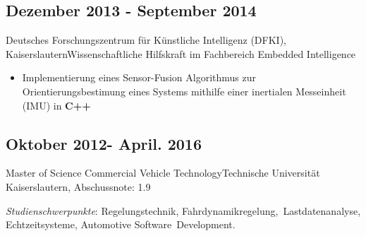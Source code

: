 \documentclass{mycv}
\begin{document}
{\rlap{\color{templateColor1}\rule[0mm]{\textwidth}{\ulinewidth}}}
\begin{paracol}{2}

\switchcolumn
{}

		\subsection{Dezember 2013 - September 2014}{Deutsches Forschungszentrum
			f{\"u}r K{\"u}nstliche Intelligenz (DFKI),
		Kaiserslautern}{Wissenschaftliche Hilfskraft im Fachbereich Embedded
		Intelligence} 
	  \begin{itemize}
			\item Implementierung eines Sensor-Fusion Algorithmus zur
				\,Orientierungsbestimung eines Systems mithilfe einer inertialen
				Messeinheit (IMU) in {\bfseries C++}\\
	  \end{itemize}


		\subsection{Oktober 2012- April. 2016}{Master of Science Commercial Vehicle
		Technology}{Technische Universit{\"a}t Kaiserslautern, {Abschussnote: 1.9}}

		{\textit{Studienschwerpunkte}}: Regelungstechnik, Fahrdynamikregelung,
		\,Lastdatenanalyse, Echtzeitsysteme, Automotive	Software \,Development.\\


\end{paracol}
\end{document}
